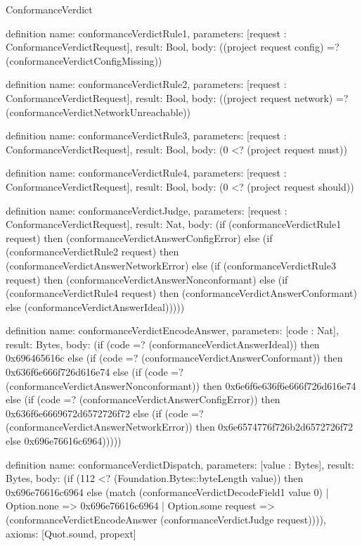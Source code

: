 \begin{lexlean}{ConformanceVerdict}
\begin{semanticmodule}
definition{
  name: conformanceVerdictRule1,
  parameters: [request : ConformanceVerdictRequest],
  result: Bool,
  body: ((project request config) =? (conformanceVerdictConfigMissing))
}

definition{
  name: conformanceVerdictRule2,
  parameters: [request : ConformanceVerdictRequest],
  result: Bool,
  body: ((project request network) =? (conformanceVerdictNetworkUnreachable))
}

definition{
  name: conformanceVerdictRule3,
  parameters: [request : ConformanceVerdictRequest],
  result: Bool,
  body: (0 <? (project request must))
}

definition{
  name: conformanceVerdictRule4,
  parameters: [request : ConformanceVerdictRequest],
  result: Bool,
  body: (0 <? (project request should))
}

definition{
  name: conformanceVerdictJudge,
  parameters: [request : ConformanceVerdictRequest],
  result: Nat,
  body: (if (conformanceVerdictRule1 request) then (conformanceVerdictAnswerConfigError) else (if (conformanceVerdictRule2 request) then (conformanceVerdictAnswerNetworkError) else (if (conformanceVerdictRule3 request) then (conformanceVerdictAnswerNonconformant) else (if (conformanceVerdictRule4 request) then (conformanceVerdictAnswerConformant) else (conformanceVerdictAnswerIdeal)))))
}

definition{
  name: conformanceVerdictEncodeAnswer,
  parameters: [code : Nat],
  result: Bytes,
  body: (if (code =? (conformanceVerdictAnswerIdeal)) then 0x696465616c else (if (code =? (conformanceVerdictAnswerConformant)) then 0x636f6e666f726d616e74 else (if (code =? (conformanceVerdictAnswerNonconformant)) then 0x6e6f6e636f6e666f726d616e74 else (if (code =? (conformanceVerdictAnswerConfigError)) then 0x636f6e6669672d6572726f72 else (if (code =? (conformanceVerdictAnswerNetworkError)) then 0x6e6574776f726b2d6572726f72 else 0x696e76616c6964)))))
}

definition{
  name: conformanceVerdictDispatch,
  parameters: [value : Bytes],
  result: Bytes,
  body: (if (112 <? (Foundation.Bytes::byteLength value)) then 0x696e76616c6964 else (match (conformanceVerdictDecodeField1 value 0)
    | Option.none => 0x696e76616c6964
    | Option.some request => (conformanceVerdictEncodeAnswer (conformanceVerdictJudge request)))),
  axioms: [Quot.sound, propext]
}
\end{semanticmodule}
\end{lexlean}
